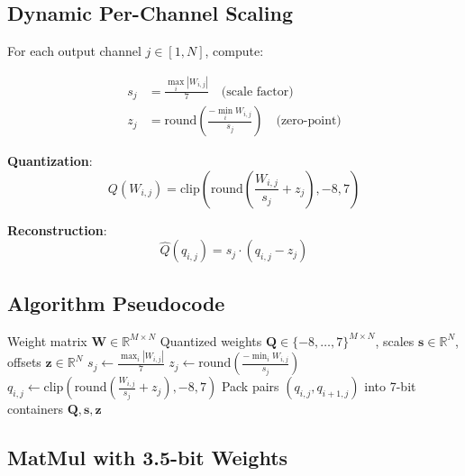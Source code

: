 \documentclass{article}
\begin{document}


\subsection{Dynamic Per-Channel Scaling}

For each output channel $j \in [1, N]$, compute:

\begin{align}
    s_j &= \frac{\max_i |W_{i,j}|}{7} \quad \text{(scale factor)} \\
    z_j &= \text{round}\left(\frac{-\min_i W_{i,j}}{s_j}\right) \quad \text{(zero-point)}
\end{align}

\textbf{Quantization}:
\begin{equation}
    Q(W_{i,j}) = \text{clip}\left(\text{round}\left(\frac{W_{i,j}}{s_j} + z_j\right), -8, 7\right)
\end{equation}

\textbf{Reconstruction}:
\begin{equation}
    \hat{Q}(q_{i,j}) = s_j \cdot (q_{i,j} - z_j)
\end{equation}

\subsection{Algorithm Pseudocode}

\begin{algorithm}[H]
\caption{3.5-bit Dynamic Asymmetric Quantization}
\label{alg:quantize}
\begin{algorithmic}[1]
\REQUIRE Weight matrix $\mathbf{W} \in \mathbb{R}^{M \times N}$
\ENSURE Quantized weights $\mathbf{Q} \in \{-8, \ldots, 7\}^{M \times N}$, scales $\mathbf{s} \in \mathbb{R}^N$, offsets $\mathbf{z} \in \mathbb{R}^N$
    \STATE $s_j \gets \frac{\max_i |W_{i,j}|}{7}$
    \STATE $z_j \gets \text{round}\left(\frac{-\min_i W_{i,j}}{s_j}\right)$
        \STATE $q_{i,j} \gets \text{clip}\left(\text{round}\left(\frac{W_{i,j}}{s_j} + z_j\right), -8, 7\right)$
    \ENDFOR
\ENDFOR
\STATE Pack pairs $(q_{i,j}, q_{i+1,j})$ into 7-bit containers
\RETURN $\mathbf{Q}, \mathbf{s}, \mathbf{z}$
\end{algorithmic}
\end{algorithm}

\subsection{MatMul with 3.5-bit Weights}
\end{document}
